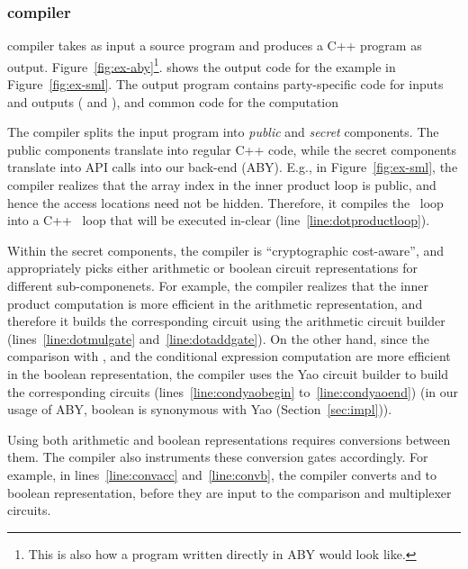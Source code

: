 \subsubsection*{\tool compiler}
\tool compiler takes as input a source program and produces a C++
program as output. Figure~\ref{fig:ex-aby}\footnote{This is also how a program written directly in
  ABY would look like.}. shows the output code for
the example in Figure~\ref{fig:ex-sml}. The output program
contains party-specific code for inputs and outputs
( and ), and common code for the
computation

The compiler splits the input
program into \emph{public} and \emph{secret} components. The public
components translate into regular C++ code, while the secret
components translate into API calls into our \mpc back-end
(ABY). E.g., in Figure~\ref{fig:ex-sml}, the \tool
compiler realizes that the array index  in the inner product loop
is public, and hence the access locations need not be hidden.
Therefore, it compiles the ~loop into a C++
~loop that will be executed in-clear
(line~\ref{line:dotproductloop}).

Within the secret components, the \tool compiler is ``cryptographic
cost-aware'', and appropriately picks either arithmetic or boolean
circuit representations for different sub-componenets. For example,
the compiler realizes that the inner product computation is more
efficient in the arithmetic representation, and therefore it builds
the corresponding circuit using the arithmetic circuit builder
 (lines~\ref{line:dotmulgate} and~\ref{line:dotaddgate}). On
the other hand, since the comparison with , and the conditional
expression computation are more efficient in the boolean
representation, the \tool compiler uses the Yao circuit builder
 to build the corresponding circuits
(lines~\ref{line:condyaobegin} to~\ref{line:condyaoend}) (in our usage
of ABY, boolean is synonymous with Yao (Section~\ref{sec:impl})).

Using both arithmetic and boolean representations requires conversions between them.
The \tool compiler also
instruments these conversion gates accordingly. For example, in
lines~\ref{line:convacc} and~\ref{line:convb}, the compiler converts
 and  to boolean representation, before they are
input to the comparison and multiplexer circuits.

